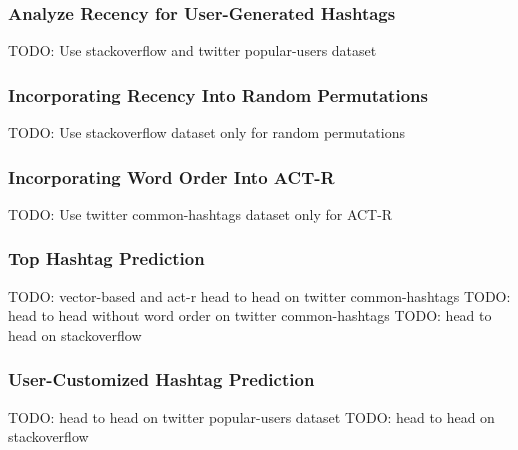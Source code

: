 \documentclass[man]{apa6}
\begin{document}
\subsubsection{Analyze Recency for User-Generated Hashtags}

TODO: Use stackoverflow and twitter popular-users dataset

\subsubsection{Incorporating Recency Into Random Permutations}

TODO: Use stackoverflow dataset only for random permutations

\subsubsection{Incorporating Word Order Into ACT-R}

TODO: Use twitter common-hashtags dataset only for ACT-R

\subsubsection{Top Hashtag Prediction}

TODO: vector-based and act-r head to head on twitter common-hashtags
TODO: head to head without word order on twitter common-hashtags
TODO: head to head on stackoverflow

\subsubsection{User-Customized Hashtag Prediction}

TODO: head to head on twitter popular-users dataset
TODO: head to head on stackoverflow

\begingroup
{}
\setlength\bibitemsep{12pt}
\printbibliography
\endgroup
\end{document}
